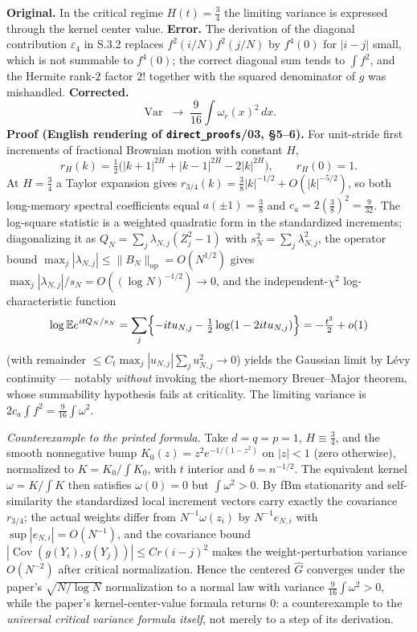 \documentclass[11pt]{article}
\theoremstyle{definition}
\theoremstyle{remark}
\newcommand{\statustag}[1]{%
  \par\nobreak\begingroup\footnotesize\itshape\raggedleft #1\par\endgroup}
\newcommand{\Wwritten}{[written]}
\begin{document}
\noindent\textbf{Original.} In the critical regime $H(t)=\tfrac34$ the limiting
variance is expressed through the kernel center value.
\textbf{Error.} The derivation of the diagonal contribution $\varepsilon_4$
in S.3.2 replaces $f^2(i/N)f^2(j/N)$ by $f^4(0)$ for $|i-j|$ small, which is
not summable to $f^4(0)$; the correct diagonal sum tends to $\int f^2$, and
the Hermite rank-$2$ factor $2!$ together with the squared denominator of
$g$ was mishandled.
\textbf{Corrected.}
\[
\operatorname{Var} \;\longrightarrow\; \frac{9}{16}\int \omega_r(x)^2\,dx .
\]
\textbf{Proof (English rendering of \texttt{direct\_proofs}/03, \S5--6).}
For unit-stride first increments of fractional Brownian motion with constant
$H$,
\[
r_H(k)=\tfrac12\bigl(|k+1|^{2H}+|k-1|^{2H}-2|k|^{2H}\bigr),\qquad r_H(0)=1 .
\]
At $H=\tfrac34$ a Taylor expansion gives
$r_{3/4}(k)=\tfrac38|k|^{-1/2}+O(|k|^{-5/2})$, so both long-memory spectral
coefficients equal $a(\pm1)=\tfrac38$ and $c_a=2(\tfrac38)^2=\tfrac9{32}$.
The log-square statistic is a weighted quadratic form in the standardized
increments; diagonalizing it as $Q_N=\sum_j\lambda_{N,j}(Z_j^2-1)$ with
$s_N^2=\sum_j\lambda_{N,j}^2$, the operator bound
$\max_j|\lambda_{N,j}|\le\|B_N\|_{\mathrm{op}}=O(N^{1/2})$ gives
$\max_j|\lambda_{N,j}|/s_N=O((\log N)^{-1/2})\to0$, and the
independent-$\chi^2$ log-characteristic function
\[
\log \mathbb E e^{itQ_N/s_N}
=\sum_j\Bigl\{-itu_{N,j}-\tfrac12\log(1-2itu_{N,j})\Bigr\}
=-\tfrac{t^2}{2}+o(1)
\]
(with remainder $\le C_t\max_j|u_{N,j}|\sum_ju_{N,j}^2\to0$) yields the
Gaussian limit by L\'evy continuity --- notably \emph{without} invoking the
short-memory Breuer--Major theorem, whose summability hypothesis fails at
criticality. The limiting variance is $2c_a\int f^2=\frac9{16}\int\omega^2$.

\smallskip
\emph{Counterexample to the printed formula.} Take $d=q=p=1$, $H\equiv
\frac34$, and the smooth nonnegative bump
$K_0(z)=z^2e^{-1/(1-z^2)}$ on $|z|<1$ (zero otherwise), normalized to
$K=K_0/\int K_0$, with $t$ interior and $b=n^{-1/2}$. The equivalent kernel
$\omega=K/\int K$ then satisfies $\omega(0)=0$ but $\int\omega^2>0$. By fBm
stationarity and self-similarity the standardized local increment vectors
carry exactly the covariance $r_{3/4}$; the actual weights differ from
$N^{-1}\omega(z_i)$ by $N^{-1}e_{N,i}$ with $\sup|e_{N,i}|=O(N^{-1})$, and
the covariance bound $|\operatorname{Cov}(g(Y_i),g(Y_j))|\le Cr(i-j)^2$ makes
the weight-perturbation variance $O(N^{-2})$ after critical normalization.
Hence the centered $\widehat G$ converges under the paper's
$\sqrt{N/\log N}$ normalization to a normal law with variance
$\frac9{16}\int\omega^2>0$, while the paper's kernel-center-value formula
returns $0$: a counterexample to the \emph{universal critical variance
formula itself}, not merely to a step of its derivation.
\statustag{\Wwritten}
\end{document}
